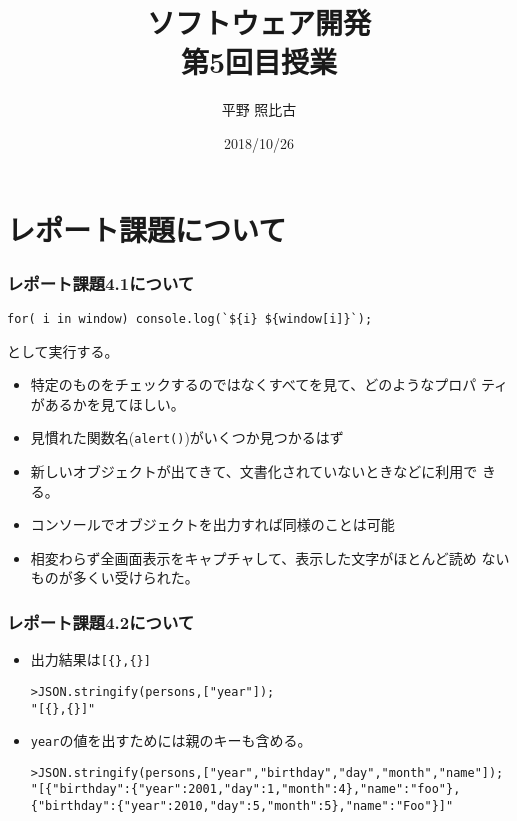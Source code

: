 %

\title{ソフトウェア開発\\第5回目授業}
\author{平野 照比古}
\institute{}
\date{2018/10/26}

\frame{\maketitle}
\section{レポート課題について}
\begin{frame}[containsverbatim]
 \frametitle{レポート課題4.1について}
\begin{Verbatim}
for( i in window) console.log(`${i} ${window[i]}`);
\end{Verbatim}
 として実行する。
 \begin{itemize}
  \item 特定のものをチェックするのではなくすべてを見て、どのようなプロパ
        ティがあるかを見てほしい。
  \item 見慣れた関数名(\Verb+alert()+)がいくつか見つかるはず
  \item 新しいオブジェクトが出てきて、文書化されていないときなどに利用で
        きる。
  \item コンソールでオブジェクトを出力すれば同様のことは可能
  \item 相変わらず全画面表示をキャプチャして、表示した文字がほとんど読め
        ないものが多くい受けられた。
 \end{itemize}
\end{frame}
\begin{frame}[containsverbatim]
 \frametitle{レポート課題4.2について}
 \begin{itemize}
  \item      出力結果は\Verb+[{},{}]+
\begin{Verbatim}
>JSON.stringify(persons,["year"]);
"[{},{}]"
 \end{Verbatim}
  \item \texttt{year}の値を出すためには親のキーも含める。
        {\footnotesize
\begin{Verbatim}
>JSON.stringify(persons,["year","birthday","day","month","name"]);
"[{"birthday":{"year":2001,"day":1,"month":4},"name":"foo"},
{"birthday":{"year":2010,"day":5,"month":5},"name":"Foo"}]"
\end{Verbatim}
        }
 \end{itemize}
\end{frame}
